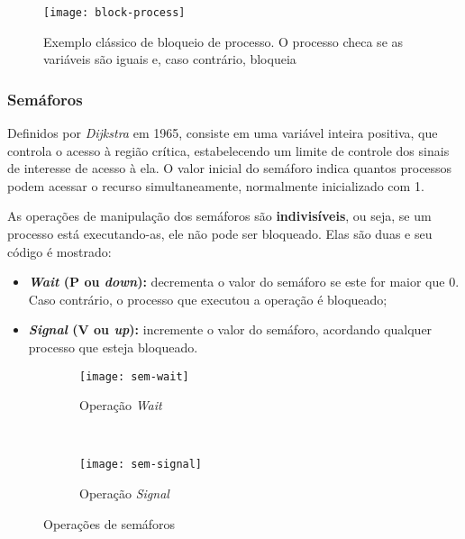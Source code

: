 \begin{figure}[H]
  \centering
  \texttt{[image: block-process]}
  \caption{Exemplo clássico de bloqueio de processo. O processo checa se as variáveis são iguais e, caso contrário, bloqueia}
  \label{fig:block-process}
\end{figure}




\subsubsection{Semáforos}
Definidos por \textit{Dijkstra} em 1965, consiste em uma variável inteira positiva, que controla o acesso à região crítica, estabelecendo um limite de controle dos sinais de interesse de acesso à ela. O valor inicial do semáforo indica quantos processos podem acessar o recurso simultaneamente, normalmente inicializado com 1.

As operações de manipulação dos semáforos são \textbf{indivisíveis}, ou seja, se um processo está executando-as, ele não pode ser bloqueado. Elas são duas e seu código é mostrado:

\begin{itemize}
  \item \textbf{\textit{Wait} (P ou \textit{down}):} decrementa o valor do semáforo se este for maior que 0. Caso contrário, o processo que executou a operação é bloqueado;

  \item \textbf{\textit{Signal} (V ou \textit{up}):} incremente o valor do semáforo, acordando qualquer processo que esteja bloqueado.
\end{itemize}

\begin{figure*}[ht]

  \begin{subfigure}[t]{.5\textwidth}
    \centering
    \texttt{[image: sem-wait]}
    \caption{Operação \textit{Wait}}
    \label{subfig:sem-wait}
  \end{subfigure}
  ~
  \begin{subfigure}[t]{.5\textwidth}
    \centering
    \texttt{[image: sem-signal]}
    \caption{Operação \textit{Signal}}
    \label{subfig:sem-signal}
  \end{subfigure}

  \caption{Operações de semáforos}
  \label{fig:sem-ops}
\end{figure*}


